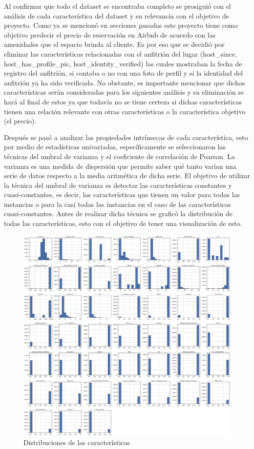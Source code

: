 \documentclass[sigconf,authorversion,nonacm]{acmart}
\begin{document}
Al confirmar que todo el dataset se encontraba completo se prosiguió con el análisis de cada característica del dataset y su relevancia con el objetivo de proyecto. Como ya se mencionó en secciones pasadas este proyecto tiene como objetivo predecir el precio de reservación en Airbnb de acuerdo con las amenidades que el espacio brinda al cliente. Es por eso que se decidió por eliminar las características relacionadas con el anfitrión del lugar (host\_since, host\_has\_profile\_pic, host\_identity\_verified) las cuales mostraban la fecha de registro del anfitrión, si contaba o no con una foto de perfil y si la identidad del anfitrión ya ha sido verificada. No obstante, es importante mencionar que dichas características serán consideradas para los siguientes análisis y su eliminación se hará al final de estos ya que todavía no se tiene certeza si dichas características tienen una relación relevante con otras características o la característica objetivo (el precio).

Después se pasó a analizar las propiedades intrínsecas de cada característica, esto por medio de estadísticas univariadas, específicamente se seleccionaron las técnicas del umbral de varianza y el coeficiente de correlación de Pearson. 
La varianza es una medida de dispersión que permite saber qué tanto varían una serie de datos respecto a la media aritmética de dicha serie. El objetivo de utilizar la técnica del umbral de varianza es detectar las características constantes y cuasi-constantes, es decir, las características que tienen un valor para todas las instancias o para la casi todas las instancias en el caso de las características cuasi-constantes. Antes de realizar dicha técnica se graficó la distribución de todas las características, esto con el objetivo de tener una visualización de esto. 

\begin{figure}[H]
  \centering
  \includegraphics[width=\linewidth]{Distribucion_features.png}
  \caption{Distribuciones de las características}
\end{figure}
\end{document}
